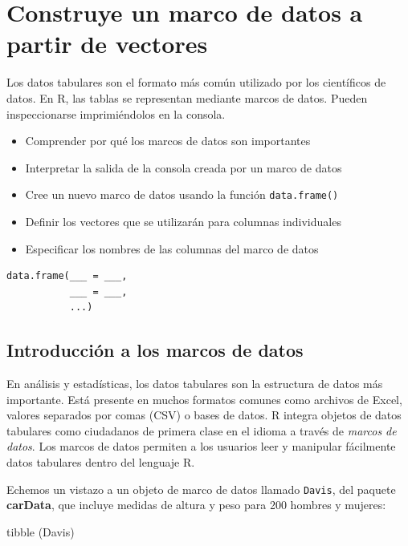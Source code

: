 \documentclass[
]{book}
\newenvironment{Shaded}{\begin{snugshade}}{\end{snugshade}}
\newcommand{\FunctionTok}[1]{\textcolor[rgb]{0.00,0.00,0.00}{#1}}
\newcommand{\NormalTok}[1]{#1}
\providecommand{\tightlist}{%
  \setlength{\itemsep}{0pt}\setlength{\parskip}{0pt}}
\begin{document}
\hypertarget{construye-un-marco-de-datos-a-partir-de-vectores}{%
\section{Construye un marco de datos a partir de vectores}\label{construye-un-marco-de-datos-a-partir-de-vectores}}

Los datos tabulares son el formato más común utilizado por los científicos de datos. En R, las tablas se representan mediante marcos de datos. Pueden inspeccionarse imprimiéndolos en la consola.

\begin{itemize}
\tightlist
\item
  Comprender por qué los marcos de datos son importantes
\item
  Interpretar la salida de la consola creada por un marco de datos
\item
  Cree un nuevo marco de datos usando la función \texttt{data.frame()}
\item
  Definir los vectores que se utilizarán para columnas individuales
\item
  Especificar los nombres de las columnas del marco de datos
\end{itemize}

\begin{verbatim}
data.frame(___ = ___, 
           ___ = ___, 
           ...)
\end{verbatim}

\hypertarget{introducciuxf3n-a-los-marcos-de-datos}{%
\subsection{Introducción a los marcos de datos}\label{introducciuxf3n-a-los-marcos-de-datos}}

En análisis y estadísticas, los datos tabulares son la estructura de datos más importante. Está presente en muchos formatos comunes como archivos de Excel, valores separados por comas (CSV) o bases de datos. R integra objetos de datos tabulares como ciudadanos de primera clase en el idioma a través de \emph{marcos de datos}. Los marcos de datos permiten a los usuarios leer y manipular fácilmente datos tabulares dentro del lenguaje R.

Echemos un vistazo a un objeto de marco de datos llamado \texttt{Davis}, del paquete \textbf{carData}, que incluye medidas de altura y peso para 200 hombres y mujeres:

\begin{Shaded}
\begin{Highlighting}[]
\FunctionTok{tibble}\NormalTok{ (Davis)}
\end{Highlighting}
\end{Shaded}
\end{document}
